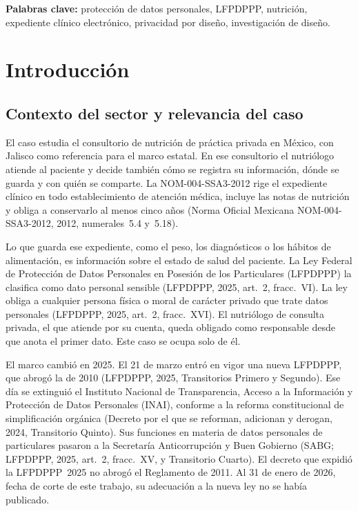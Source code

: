 \documentclass[12pt, a4paper]{article}
\makeatletter
\newcommand{\saltoseccion}{\par
  \ifx\@deferlist\@empty
    \ifdim\pagegoal<\maxdimen
      \ifdim\dimexpr\textheight-\pagegoal+\pagetotal\relax>0.5\textheight\clearpage\fi
    \fi
  \else\clearpage\fi}
\let\seccionbase\section
\renewcommand{\section}{\saltoseccion\seccionbase}
\makeatother
\begin{document}
\noindent\textbf{Palabras clave:} protección de datos personales,
LFPDPPP, nutrición, expediente clínico electrónico, privacidad por
diseño, investigación de diseño.

\section{Introducción}

\subsection{Contexto del sector y relevancia del caso}
El caso estudia el consultorio de nutrición de práctica privada en
México, con Jalisco como referencia para el marco estatal. En ese
consultorio el nutriólogo atiende al paciente y decide también cómo se
registra su información, dónde se guarda y con quién se comparte. La
NOM-004-SSA3-2012 rige el expediente clínico en todo establecimiento de
atención médica, incluye las notas de
nutrición y obliga a
conservarlo al menos cinco años (Norma
Oficial Mexicana NOM-004-SSA3-2012, 2012, numerales~5.4 y~5.18).
 
Lo que guarda ese expediente, como el peso, los diagnósticos o los
hábitos de alimentación, es información sobre el estado de salud del
paciente. La Ley Federal de Protección de Datos Personales en Posesión
de los Particulares (LFPDPPP) la clasifica como dato personal sensible
(LFPDPPP, 2025, art.~2, fracc.~VI). La ley obliga a cualquier persona
física o moral de carácter privado que trate datos personales
(LFPDPPP, 2025, art.~2, fracc.~XVI). El nutriólogo de consulta
privada, el que atiende por su cuenta, queda obligado como
responsable desde que anota el primer dato. Este caso se ocupa solo de
él.
 
El marco cambió en 2025. El 21 de marzo entró en vigor una nueva
LFPDPPP, que abrogó la de 2010 (LFPDPPP, 2025, Transitorios Primero y
Segundo). Ese día se extinguió el Instituto Nacional de Transparencia,
Acceso a la Información y Protección de Datos Personales (INAI),
conforme a la reforma constitucional de simplificación orgánica (Decreto
por el que se reforman, adicionan y derogan, 2024, Transitorio Quinto).
Sus funciones en materia de datos personales de particulares pasaron a
la Secretaría Anticorrupción y Buen Gobierno (SABG; LFPDPPP, 2025, art.~2,
fracc.~XV, y Transitorio Cuarto). El decreto que expidió la LFPDPPP~2025
no abrogó el Reglamento de 2011. Al 31 de enero de 2026, fecha de corte
de este trabajo, su adecuación a la nueva ley no se había publicado.
 
\end{document}
